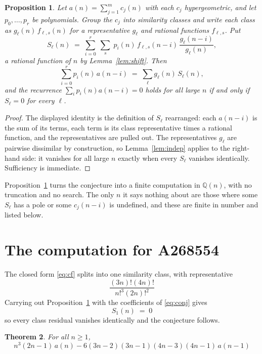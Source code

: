 \documentclass[11pt,a4paper]{article}
\theoremstyle{plain}
\newtheorem{theorem}{Theorem}
\newtheorem{proposition}[theorem]{Proposition}
\theoremstyle{definition}
\begin{document}
\begin{proposition}\label{prop:main}
Let $a(n)=\sum_{j=1}^{m}c_{j}(n)$ with each $c_{j}$ hypergeometric, and let
$p_{0},\dots,p_{r}$ be polynomials. Group the $c_{j}$ into similarity classes and write
each class as $g_{\ell}(n)\,f_{\ell,s}(n)$ for a representative $g_{\ell}$ and rational
functions $f_{\ell,s}$. Put
\[
S_{\ell}(n)\;=\;\sum_{i=0}^{r}\;\sum_{s}\;p_{i}(n)\,f_{\ell,s}(n-i)\,
\frac{g_{\ell}(n-i)}{g_{\ell}(n)} ,
\]
a rational function of $n$ by Lemma~\ref{lem:shift}. Then
\[
\sum_{i=0}^{r}p_{i}(n)\,a(n-i)\;=\;\sum_{\ell}g_{\ell}(n)\,S_{\ell}(n),
\]
and the recurrence $\sum_{i}p_{i}(n)a(n-i)=0$ holds for all large $n$ if and only if
$S_{\ell}=0$ for every $\ell$.
\end{proposition}

\begin{proof}
The displayed identity is the definition of $S_{\ell}$ rearranged: each $a(n-i)$ is the
sum of its terms, each term is its class representative times a rational function, and the
representatives are pulled out. The representatives $g_{\ell}$ are pairwise dissimilar by
construction, so Lemma~\ref{lem:indep} applies to the right-hand side: it vanishes for all
large $n$ exactly when every $S_{\ell}$ vanishes identically. Sufficiency is immediate.
\end{proof}

Proposition~\ref{prop:main} turns the conjecture into a finite computation in
$\mathbb{Q}(n)$, with no truncation and no search. The only $n$ it says nothing about are
those where some $S_{\ell}$ has a pole or some $c_{j}(n-i)$ is undefined, and these are
finite in number and listed below.

\section{The computation for A268554}

The closed form \eqref{eq:cf} splits into one similarity class, with
representative
\[
\frac{\left(3 n\right)! \left(4 n\right)!}{n!^{3} \left(2 n\right)!^{2}}
\]
Carrying out Proposition~\ref{prop:main} with the coefficients of \eqref{eq:conj} gives
\[
S_{1}(n)\;=\;0
\]
so every class residual vanishes identically and the conjecture follows.

\begin{theorem}
For all $n\ge 1$,
\[
n^{3} \left(2 n - 1\right)\,a(n) -  6 \left(3 n - 2\right) \left(3 n - 1\right) \left(4 n - 3\right) \left(4 n - 1\right)\,a(n-1)
\]
\end{theorem}
\end{document}
